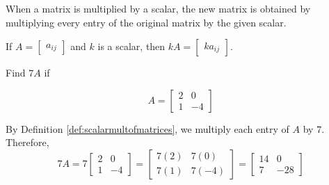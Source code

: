 \documentclass{ximera}
\begin{document}
When a matrix is multiplied by a scalar, the new matrix is obtained by multiplying every entry of the original matrix
by the given scalar. 

\begin{definition}\label{def:scalarmultofmatrices}
If $A=\begin{bmatrix} a_{ij}\end{bmatrix} $ and $k$ is a scalar,
then $kA=\begin{bmatrix} ka_{ij}\end{bmatrix}$. 
\end{definition}

\begin{example}\label{ex:effectofscalarmult}
Find $7A$ if

$$A=\begin{bmatrix}
2 & 0 \\
1 & -4
\end{bmatrix}$$



\begin{explanation}
By Definition \ref{def:scalarmultofmatrices}, we multiply each entry of $A$ by $7$.
Therefore,
$$7A = 
7\begin{bmatrix}
2 & 0 \\
1 & -4
\end{bmatrix} =
\begin{bmatrix}
7(2) & 7(0) \\
7(1) & 7(-4)
\end{bmatrix} =
\begin{bmatrix}
14 & 0 \\
7 & -28
\end{bmatrix}$$
\end{explanation}
\end{example}
\end{document}
